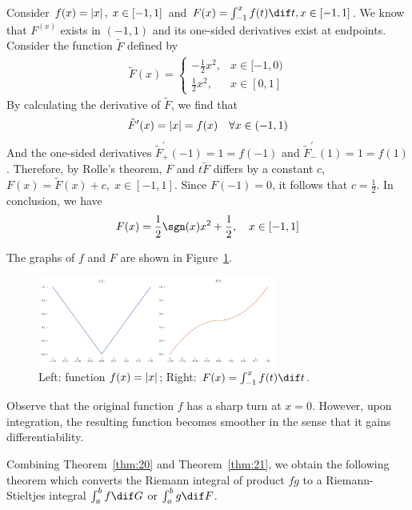 \documentclass[thmcnt=section, color=blue, 12pt]{my-elegantbook}
\begin{document}
\begin{example}
	Consider $f(x) = \left\lvert x \right\rvert, \; x \in [-1, 1]$
	and $F(x) = \int_{-1}^x f(t) \dif t, x \in [-1, 1]$.
	We know that $F^(x)$ exists in $(-1, 1)$
	and its one-sided derivatives exist at endpoints.
	Consider the function $\tilde{F}$ defined by
	\begin{align*}
		\tilde{F}(x)
		= \begin{cases}
			  -\frac{1}{2} x^2, & x \in [-1, 0) \\
			  \frac{1}{2} x^2,  & x \in [0, 1]
		  \end{cases}
	\end{align*}
	By calculating the derivative of $\tilde{F}$,
	we find that
	\begin{align*}
		\tilde{F}^\prime(x) = \left\lvert x \right\rvert = f(x) \quad \forall x \in (-1, 1)
	\end{align*}
	And the one-sided derivatives $\tilde{F}^\prime_{+}(-1) = 1 = f(-1)$
	and $\tilde{F}^\prime_{-}(1) = 1 = f(1)$.
	Therefore, by Rolle's theorem, $F$ and $t\tilde{F}$ differs by a constant $c$,
	$F(x) = \tilde{F}(x) + c, \; x\in [-1, 1]$.
	Since $F(-1) = 0$, it follows that $c = \frac{1}{2}$.
	In conclusion, we have
	\begin{align*}
		F(x) = \frac{1}{2} \sgn(x) x^2 + \frac{1}{2}, \quad x \in [-1, 1]
	\end{align*}

	The graphs of $f$ and $F$ are shown in Figure~\ref{fig:9}.
	\begin{figure}[H]
		\centering
		\includegraphics[width=0.7\textwidth]{figures/absolute-value-function-and-its-antiderivative.png}
		\caption{Left: function $f(x) = \left\lvert x \right\rvert$; Right: $F(x) = \int_{-1}^x f(t) \dif t$.}
		\label{fig:9}
	\end{figure}

	Observe that the original function $f$ has a sharp turn at $x=0$.
	However, upon integration,
	the resulting function becomes smoother in the sense that it gains differentiability.
\end{example}

Combining Theorem~\ref{thm:20} and Theorem~\ref{thm:21},
we obtain the following theorem
which converts the Riemann integral of product $fg$
to a Riemann-Stieltjes integral $\int_a^b f \dif G$ or $\int_a^b g \dif F$.
\end{document}
